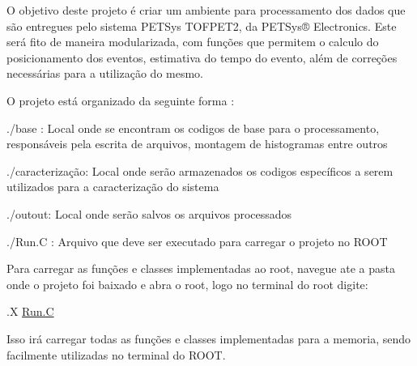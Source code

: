O objetivo deste projeto é criar um ambiente para processamento dos dados que são entregues pelo sistema PETSys TOFPET2, da PETSys® Electronics. Este será fito de maneira modularizada, com funções que permitem o calculo do posicionamento dos eventos, estimativa do tempo do evento, além de correções necessárias para a utilização do mesmo.

O projeto está organizado da seguinte forma \+:


\begin{DoxyItemize}
\item ./base \+: Local onde se encontram os codigos de base para o processamento, responsáveis pela escrita de arquivos, montagem de histogramas entre outros
\item ./caracterização\+: Local onde serão armazenados os codigos específicos a serem utilizados para a caracterização do sistema
\item ./outout\+: Local onde serão salvos os arquivos processados
\item ./\+Run.C \+: Arquivo que deve ser executado para carregar o projeto no ROOT
\end{DoxyItemize}

Para carregar as funções e classes implementadas ao root, navegue ate a pasta onde o projeto foi baixado e abra o root, logo no terminal do root digite\+:

\textquotesingle{}\textquotesingle{}\textquotesingle{}

.X \mbox{\hyperlink{Run_8C}{Run.\+C}}

\textquotesingle{}\textquotesingle{}\textquotesingle{}

Isso irá carregar todas as funções e classes implementadas para a memoria, sendo facilmente utilizadas no terminal do ROOT. 